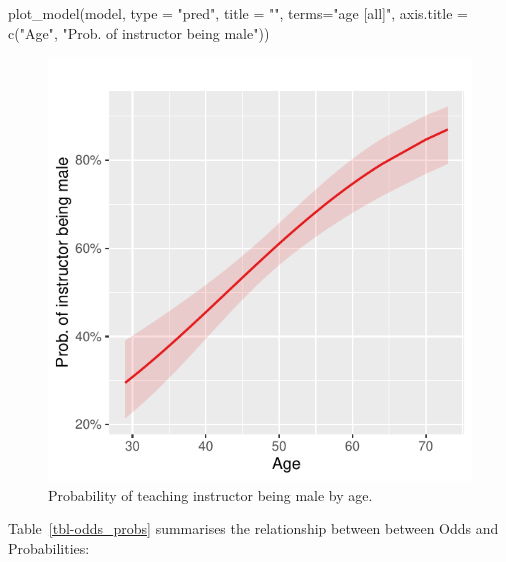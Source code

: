\documentclass[
  letterpaper,
  DIV=11,
  numbers=noendperiod]{scrartcl}
\newenvironment{Shaded}{\begin{snugshade}}{\end{snugshade}}
\newcommand{\AttributeTok}[1]{\textcolor[rgb]{0.40,0.45,0.13}{#1}}
\newcommand{\FunctionTok}[1]{\textcolor[rgb]{0.28,0.35,0.67}{#1}}
\newcommand{\NormalTok}[1]{\textcolor[rgb]{0.00,0.23,0.31}{#1}}
\newcommand{\StringTok}[1]{\textcolor[rgb]{0.13,0.47,0.30}{#1}}
\begin{document}
\begin{Shaded}
\begin{Highlighting}[]
\FunctionTok{plot\_model}\NormalTok{(model, }
           \AttributeTok{type =} \StringTok{"pred"}\NormalTok{, }
           \AttributeTok{title =} \StringTok{""}\NormalTok{, }
           \AttributeTok{terms=}\StringTok{"age [all]"}\NormalTok{, }
           \AttributeTok{axis.title =} \FunctionTok{c}\NormalTok{(}\StringTok{"Age"}\NormalTok{, }\StringTok{"Prob. of instructor being male"}\NormalTok{))}
\end{Highlighting}
\end{Shaded}

\begin{figure}[H]

{\centering \includegraphics{index_files/figure-pdf/unnamed-chunk-24-1.pdf}

}

\caption{Probability of teaching instructor being male by age.}

\end{figure}%

Table~\ref{tbl-odds_probs} summarises the relationship between between
Odds and Probabilities:
\end{document}
